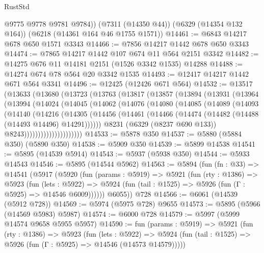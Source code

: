 \begin{lexlean}{RustStd}
\begin{coremodule}
{{        @9775
        @9778
        @9781
        @9784))
    (@7311 (@14350 @44))
    (@6329 (@14354 @132 @164))
    (@6218 (@14361 @164 @46 @1755 @1571))
@14461 := @6843 @14217 @678 @650 @1571 @3343
@14466 := @7856 @14217 @1442 @678 @650 @3343
@14474 := @7865 @14217 @1442 @107 @674 @11 @564 @2151 @3342
@14482 := @14275 @676 @11 @14181 @2151 (@1526 @3342 @1535) @14288
@14488 := @14274 @674 @78 @564 @20 @3342 @1535
@14493 := @12417 @14217 @1442 @671 @564 @3341
@14496 := @12425 (@12426 @671 @564)
@14532 := @13517
    (@13633
      (@13680
        (@13723
          (@13763
            (@13817
              (@13857
                (@13894
                  (@13931
                    (@13964
                      (@13994
                        (@14024
                          (@14045
                            (@14062
                              (@14076
                                (@14080
                                  (@14085
                                    (@14089
                                      (@14093
                                        (@14140
                                          (@14216
                                            (@14305
                                              (@14456
                                                (@14461
                                                  (@14466
                                                    (@14474
                                                      (@14482 (@14488 (@14493 @14496) @14291))))))
                                              @8231
                                              (@6329 (@8237 @690 @133))
                                              @8243)))))))))))))))))))))
@14533 := @5878 @350
@14537 := @5880 (@5884 @350) (@5890 @350)
@14538 := @5909 @350
@14539 := @5899 @14538
@14541 := @5895 (@14539 @5914)
@14543 := @5937 (@5938 @350)
@14544 := @5933 @14543
@14546 := @5895 (@14544 @5962)
@14563 := @5894
    (fun (fn : @33) =>
    @14541
      (@5917
        (@5920
          (fun (params : @5919) =>
          @5921
            (fun (rty : @1386) =>
            @5923
              (fun (lets : @5922) =>
              @5924 (fun (tail : @1525) => @5926 (fun (Γ : @5925) => @14546 @6009))))))
        @6055))
    @728
@14566 := @6061 (@14539 (@5912 @728))
@14569 := @5974 (@5975 @728) @9655
@14573 := @5895 (@5966 (@14569 @5983) @5987)
@14574 := @6000 @728
@14579 := @5997 (@5999 @14574 @9658 @5955 @5957)
@14590 := fun (params : @5919) =>
  @5921
    (fun (rty : @1386) =>
    @5923
      (fun (lets : @5922) =>
      @5924 (fun (tail : @1525) => @5926 (fun (Γ : @5925) => @14546 (@14573 @14579)))))
}}
\end{coremodule}
\end{lexlean}
